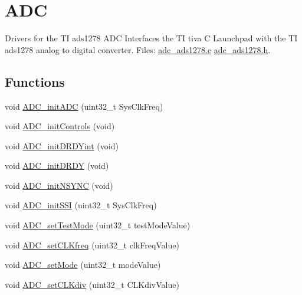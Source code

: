 \hypertarget{group___a_d_c__ads1278}{\section{A\+D\+C}
\label{group___a_d_c__ads1278}
}


Drivers for the T\+I ads1278 A\+D\+C Interfaces the T\+I tiva C Launchpad with the T\+I ads1278 analog to digital converter. Files\+: \hyperlink{adc__ads1278_8c_source}{adc\+\_\+ads1278.\+c} \hyperlink{adc__ads1278_8h_source}{adc\+\_\+ads1278.\+h}.  


\subsection*{Functions}
\begin{DoxyCompactItemize}
\item 
void \hyperlink{group___a_d_c__ads1278_gad2a0b7a0dd7616e92163541c0e1f4706}{A\+D\+C\+\_\+init\+A\+D\+C} (uint32\+\_\+t Sys\+Clk\+Freq)
\item 
void \hyperlink{group___a_d_c__ads1278_gad4e9656930b83fb827a3745f50834e9e}{A\+D\+C\+\_\+init\+Controls} (void)
\item 
void \hyperlink{group___a_d_c__ads1278_ga55cb8eb204b6e8a9247581e543e76f27}{A\+D\+C\+\_\+init\+D\+R\+D\+Yint} (void)
\item 
void \hyperlink{group___a_d_c__ads1278_ga203a59c4b8d465f9f687bc6f171894c6}{A\+D\+C\+\_\+init\+D\+R\+D\+Y} (void)
\item 
void \hyperlink{group___a_d_c__ads1278_gacf5fb3dffc13dc4e09cfcaf806481cb2}{A\+D\+C\+\_\+init\+N\+S\+Y\+N\+C} (void)
\item 
void \hyperlink{group___a_d_c__ads1278_gad85d5fb4a0453db0838a5afb155b95d8}{A\+D\+C\+\_\+init\+S\+S\+I} (uint32\+\_\+t Sys\+Clk\+Freq)
\item 
void \hyperlink{group___a_d_c__ads1278_ga570498decf3fe93b69a783a1e36a2d6c}{A\+D\+C\+\_\+set\+Test\+Mode} (uint32\+\_\+t test\+Mode\+Value)
\item 
void \hyperlink{group___a_d_c__ads1278_ga14ab736d523bd900635d7cdd8ff5d3f1}{A\+D\+C\+\_\+set\+C\+L\+Kfreq} (uint32\+\_\+t clk\+Freq\+Value)
\item 
void \hyperlink{group___a_d_c__ads1278_ga8d6e34da06566ebf70db73c06d2298f6}{A\+D\+C\+\_\+set\+Mode} (uint32\+\_\+t mode\+Value)
\item 
void \hyperlink{group___a_d_c__ads1278_ga5e6f3f3b4fb89b095a1ad8b19efc75fc}{A\+D\+C\+\_\+set\+C\+L\+Kdiv} (uint32\+\_\+t C\+L\+Kdiv\+Value)
\item 

\end{DoxyCompactItemize}
